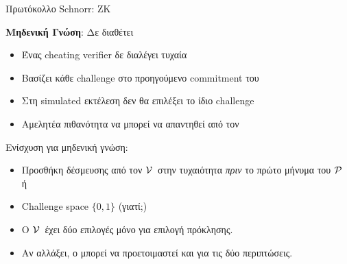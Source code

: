 \documentclass[10pt,handout]{beamer}
\begin{document}
\begin{frame}{Πρωτόκολλο Schnorr: ZK}

\textbf{Μηδενική Γνώση}: \alert{Δε διαθέτει}
\pause
\begin{itemize}
\item Ένας cheating verifier δε διαλέγει τυχαία \pause
\item Bασίζει κάθε challenge στο προηγούμενο commitment του \siml \pause
\item Στη simulated εκτέλεση δεν θα επιλέξει το ίδιο challenge \pause
\item Αμελητέα πιθανότητα να μπορεί να απαντηθεί από τον \siml \pause
\end{itemize}

Ενίσχυση για μηδενική γνώση: \pause

\begin{itemize}
\item Προσθήκη δέσμευσης από τον $\mathcal{V}\,$ στην τυχαιότητα \emph{πριν} το πρώτο μήνυμα του $\mathcal{P}\,$ ή \pause
\item Challenge space $\{ 0 , 1 \} $ (γιατί;) \pause
\item Ο $\mathcal{V}\,$ έχει δύο επιλογές μόνο για επιλογή πρόκλησης. 
\item Αν αλλάξει, ο \siml μπορεί να προετοιμαστεί και για τις δύο περιπτώσεις.
\end{itemize} 

\end{frame}
\end{document}
